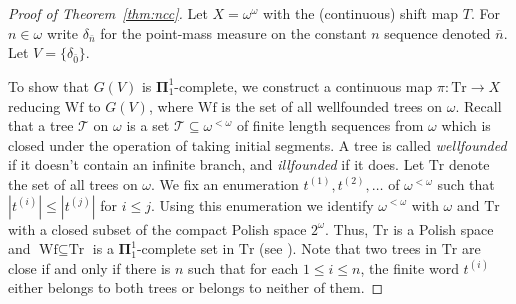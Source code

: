 \documentclass{amsart}
\theoremstyle{definition}
\newcommand{\cM}{\mathcal{M}}
\newcommand{\wf}{\text{Wf}}
\newcommand{\tr}{\text{Tr}}
\newcommand{\bp}{\boldsymbol{\Pi}}
\newcommand{\res}{\restriction}
\begin{document}
\begin{proof}[Proof of Theorem~\ref{thm:ncc}]
Let $X=\omega^\omega$ with the (continuous) shift map $T$. For $n\in\omega$
write $\delta_{\bar n}$ for the point-mass measure on the constant $n$
sequence denoted $\bar{n}$. Let $V=\{ \delta_{\bar 0}\}$.

To show that $G(V)$ is $\bp^1_1$-complete, we construct a continuous map
$\pi\colon\tr\to X$ reducing $\wf$ to $G(V)$, where $\wf$
is the set of all wellfounded trees on $\omega$. Recall that a tree $\mathcal{T}$ on $\omega$ is a
set $\mathcal{T}\subseteq \omega^{<\omega}$ of finite length sequences from $\omega$ which is
closed under the operation of taking initial segments. A tree is called \emph{wellfounded} if it doesn't contain an infinite branch, and \emph{illfounded} if it does. Let $\tr$ denote the set of all trees on $\omega$.
We fix an enumeration $t^{(1)},t^{(2)},\ldots$ of $\omega^{<\omega}$ such that
$|t^{(i)}|\le |t^{(j)}|$ for $i\le j$. Using this enumeration we identify
$\omega^{<\omega}$ with $\omega$ and $\tr$ with a closed subset of the
compact Polish space $2^\omega$.
Thus, $\tr$ is a Polish space and $\wf\subseteq \tr$ is a $\bp^1_1$-complete set
in $\tr$ (see \cite[ch. 32.B]{Kechris}). Note that two trees in $\tr$ are close
if and only if there is $n$ such that for each $1\le i \le n$, the
finite word $t^{(i)}$ either belongs to both trees or belongs to neither of them.



\end{proof}
\end{document}
